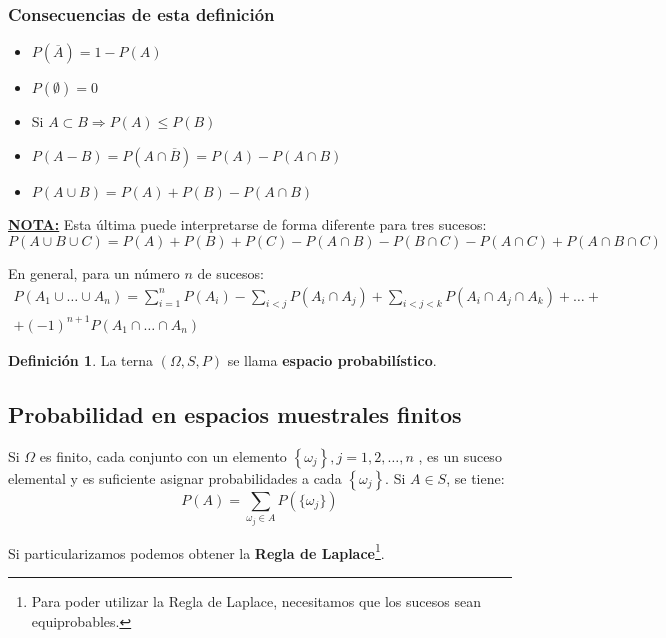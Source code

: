 \documentclass[a4paper]{book}
\numberwithin{figure}{section}
\numberwithin{equation}{subsection}
\numberwithin{figure}{chapter}
\theoremstyle{definition}
\newtheorem{definicion}{Definición}
\newenvironment{nota}{\underline{\textbf{NOTA:}}}{}
\begin{document}
\subsubsection*{Consecuencias de esta definición}
\vspace{\parskip}
\begin{itemize}
	\item $P\left( \overline{A} \right) = 1 - P(A)$
	\item $P(\emptyset )=0$
	\item Si $A\subset B \Longrightarrow P(A) \leq P(B)$
	\item $P(A-B) = P(A\cap \overline{B})= P(A) - P(A\cap B)$
	\item $ P(A\cup B) = P(A) + P(B) - P(A\cap B)$
\end{itemize}

\begin{nota}
	Esta última puede interpretarse de forma diferente para tres sucesos: \[P(A\cup B \cup C) = P(A) + P(B) + P(C) - P(A\cap B) - P(B\cap C) - P(A\cap C) + P(A\cap B\cap C)\]
\end{nota}

En general, para un número $n$ de sucesos: \[\begin{split}
		P\left( A_1\cup \ldots \cup A_n \right) = \sum^{n}_{i=1}{P\left( A_i \right)}-\sum_{i<j}{P\left( A_i \cap A_j \right)} +
		\sum_{i<j<k}{P\left( A_i \cap A_j \cap A_k \right)}+ \ldots + \\
		+ \left( -1 \right)^{n+1}P\left( A_1 \cap \ldots \cap A_n \right)
	\end{split}
\]

\begin{definicion}
	La terna $(\Omega, S, P)$ se llama \textbf{espacio probabilístico}.
\end{definicion}

\subsection*{Probabilidad en espacios muestrales finitos}
Si $\Omega$ es finito, cada conjunto con un elemento $\left\lbrace \omega _j \right\rbrace , j =1,2,\ldots ,n$ , es un suceso elemental y es suficiente asignar probabilidades a cada $\left\lbrace \omega _j \right\rbrace$. Si $A \in S$, se tiene: \[P(A) =\sum_{\omega _j \in A}{P(\{ \omega _j\} )}\]

Si particularizamos podemos obtener la \textbf{Regla de Laplace}\footnote{Para poder utilizar la Regla de Laplace, necesitamos que los sucesos sean equiprobables.}.
\end{document}
